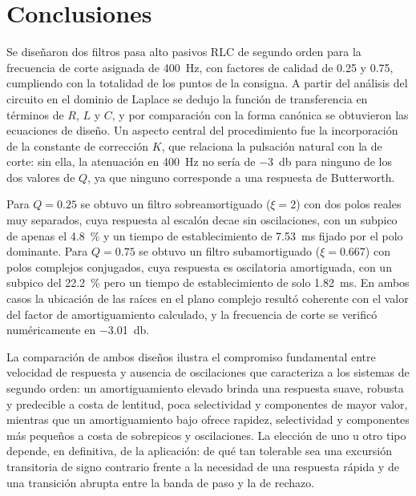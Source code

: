 \chapter{Conclusiones}
\label{chap:conclusiones}

Se diseñaron dos filtros pasa alto pasivos RLC de segundo orden para la frecuencia de corte asignada de
\qty{400}{\hertz}, con factores de calidad de \num{0.25} y \num{0.75}, cumpliendo con la totalidad de los
puntos de la consigna. A partir del análisis del circuito en el dominio de Laplace se dedujo la función de
transferencia en términos de $R$, $L$ y $C$, y por comparación con la forma canónica se obtuvieron las
ecuaciones de diseño. Un aspecto central del procedimiento fue la incorporación de la constante de
corrección $K$, que relaciona la pulsación natural con la de corte: sin ella, la atenuación en
\qty{400}{\hertz} no sería de \qty{-3}{\decibel} para ninguno de los dos valores de $Q$, ya que ninguno
corresponde a una respuesta de Butterworth.

Para $Q = \num{0.25}$ se obtuvo un filtro sobreamortiguado ($\xi = 2$) con dos polos reales muy separados,
cuya respuesta al escalón decae sin oscilaciones, con un subpico de apenas el \qty{4.8}{\percent} y un
tiempo de establecimiento de \qty{7.53}{\milli\second} fijado por el polo dominante. Para $Q = \num{0.75}$
se obtuvo un filtro subamortiguado ($\xi = \num{0.667}$) con polos complejos conjugados, cuya respuesta es
oscilatoria amortiguada, con un subpico del \qty{22.2}{\percent} pero un tiempo de establecimiento de solo
\qty{1.82}{\milli\second}. En ambos casos la ubicación de las raíces en el plano complejo resultó
coherente con el valor del factor de amortiguamiento calculado, y la frecuencia de corte se verificó
numéricamente en \qty{-3.01}{\decibel}.

La comparación de ambos diseños ilustra el compromiso fundamental entre velocidad de respuesta y ausencia
de oscilaciones que caracteriza a los sistemas de segundo orden: un amortiguamiento elevado brinda una
respuesta suave, robusta y predecible a costa de lentitud, poca selectividad y componentes de mayor valor,
mientras que un amortiguamiento bajo ofrece rapidez, selectividad y componentes más pequeños a costa de
sobrepicos y oscilaciones. La elección de uno u otro tipo depende, en definitiva, de la aplicación: de qué
tan tolerable sea una excursión transitoria de signo contrario frente a la necesidad de una respuesta
rápida y de una transición abrupta entre la banda de paso y la de rechazo.

